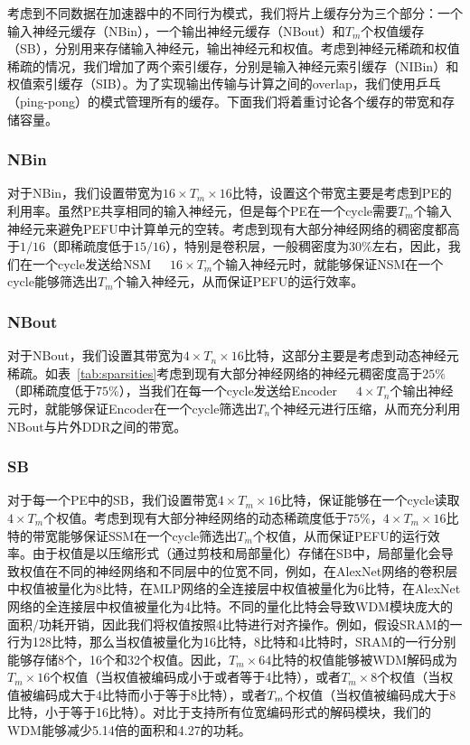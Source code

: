 考虑到不同数据在加速器中的不同行为模式，我们将片上缓存分为三个部分：一个输入神经元缓存（NBin），一个输出神经元缓存（NBout）和$T_m$个权值缓存（SB），分别用来存储输入神经元，输出神经元和权值。考虑到神经元稀疏和权值稀疏的情况，我们增加了两个索引缓存，分别是输入神经元索引缓存（NIBin）和权值索引缓存（SIB）。为了实现输出传输与计算之间的overlap，我们使用乒乓（ping-pong）的模式管理所有的缓存。下面我们将着重讨论各个缓存的带宽和存储容量。

\subsubsection{NBin} 
对于NBin，我们设置带宽为$16\times T_m \times 16$比特，设置这个带宽主要是考虑到PE的利用率。虽然PE共享相同的输入神经元，但是每个PE在一个cycle需要$T_m$个输入神经元来避免PEFU中计算单元的空转。考虑到现有大部分神经网络的稠密度都高于$1/16$（即稀疏度低于$15/16$），特别是卷积层，一般稠密度为$30\%$左右，因此，我们在一个cycle发送给NSM~~~$16\times T_m$个输入神经元时，就能够保证NSM在一个cycle能够筛选出$T_m$个输入神经元，从而保证PEFU的运行效率。

\subsubsection{NBout} 
对于NBout，我们设置其带宽为$4\times T_n \times 16$比特，这部分主要是考虑到动态神经元稀疏。如表~\ref{tab:sparsities}考虑到现有大部分神经网络的神经元稠密度高于$25\%$（即稀疏度低于$75\%$），当我们在每一个cycle发送给Encoder~~~$4\times T_n$个输出神经元时，就能够保证Encoder在一个cycle筛选出$T_n$个神经元进行压缩，从而充分利用NBout与片外DDR之间的带宽。

\subsubsection{SB}
对于每一个PE中的SB，我们设置带宽$4\times T_m\times 16$比特，保证能够在一个cycle读取$4\times T_m$个权值。考虑到现有大部分神经网络的动态稀疏度低于$75\%$，$4\times T_m \times 16$比特的带宽能够保证SSM在一个cycle筛选出$T_m$个权值，从而保证PEFU的运行效率。由于权值是以压缩形式（通过剪枝和局部量化）存储在SB中，局部量化会导致权值在不同的神经网络和不同层中的位宽不同，例如，在AlexNet网络的卷积层中权值被量化为8比特，在MLP网络的全连接层中权值被量化为6比特，在AlexNet网络的全连接层中权值被量化为4比特。不同的量化比特会导致WDM模块庞大的面积/功耗开销，因此我们将权值按照4比特进行对齐操作。例如，假设SRAM的一行为128比特，那么当权值被量化为16比特，8比特和4比特时，SRAM的一行分别能够存储8个，16个和32个权值。因此，$T_m \times 64$比特的权值能够被WDM解码成为$T_m \times 16$个权值（当权值被编码成小于或者等于4比特），或者$T_m \times 8$个权值（当权值被编码成大于4比特而小于等于8比特），或者$T_m \time 4$个权值（当权值被编码成大于8比特，小于等于16比特）。对比于支持所有位宽编码形式的解码模块，我们的WDM能够减少5.14倍的面积和4.27的功耗。

